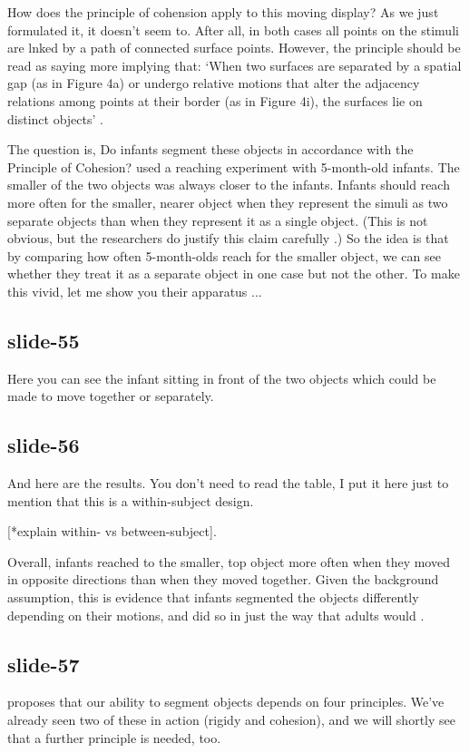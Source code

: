\documentclass[12pt,\papersize]{extarticle}
\begin{document}
How does the principle of cohension apply to this moving display? 
As we just formulated it, it doesn't seem to.  After all, in both cases all points on the 
stimuli are lnked by a path of connected surface points.
However, the principle should be read as saying more implying that:
‘When two surfaces are separated by a spatial gap (as in Figure 4a) or undergo relative motions 
that alter the adjacency relations among points at their border (as in Figure 4i), the 
surfaces lie on distinct objects’ \citep[p.\ 49]{Spelke:1990jn}.
 
The question is, Do infants segment these objects in accordance with the Principle of Cohesion?
\citet[Experiment 2]{spelke:1989_reaching} used a reaching experiment with 5-month-old infants.
The smaller of the two objects was always closer to the infants.  
Infants should reach more often for the smaller, nearer object when they represent the simuli 
as two separate objects than when they represent it as a single object.
(This is not obvious, but the researchers do justify this claim carefully 
\citep[p.\ 186]{spelke:1989_reaching}.)
So the idea is that by comparing how often 5-month-olds reach for the smaller object, we can
see whether they treat it as a separate object in one case but not the other.
To make this vivid, let me show you their apparatus ...
 
\subsection{slide-55}
Here you can see the infant sitting in front of the two objects which could be made to move
together or separately.
 
\subsection{slide-56}
And here are the results.  You don't need to read the table, I put it here just to mention
that this is a within-subject design.
 
[*explain within- vs between-subject].
 
Overall, infants reached to the smaller, top object more often when they moved in opposite 
directions than when they moved together.
Given the background assumption, this is evidence that infants segmented the objects 
differently depending on their motions, and did so in just the way that adults would
\citep[Experiment 2]{spelke:1989_reaching}.
 
\subsection{slide-57}
\citet{Spelke:1990jn} proposes that our ability to segment objects depends on four principles.
We've already seen two of these in action (rigidy and cohesion), and we will shortly see 
that a further principle is needed, too.
 
\end{document}
